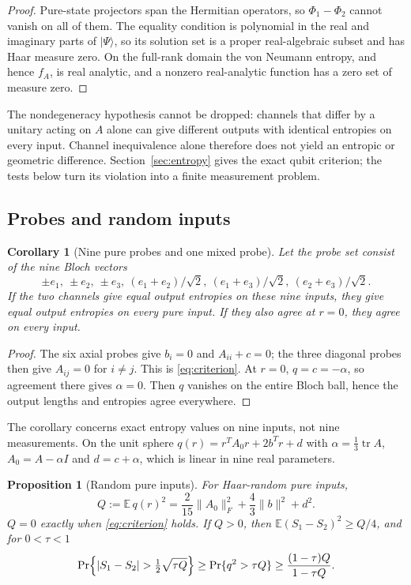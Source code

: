 \documentclass[12pt,a4paper]{article}
\newtheorem{proposition}[theorem]{Proposition}
\newtheorem{corollary}[theorem]{Corollary}
\begin{document}
\begin{proof}
Pure-state projectors span the Hermitian operators, so $\Phi_1-\Phi_2$ cannot vanish on all of them. The equality condition is polynomial in the real and imaginary parts of $|\Psi\rangle$, so its solution set is a proper real-algebraic subset and has Haar measure zero. On the full-rank domain the von Neumann entropy, and hence $f_A$, is real analytic, and a nonzero real-analytic function has a zero set of measure zero.
\end{proof}

The nondegeneracy hypothesis cannot be dropped: channels that differ
by a unitary acting on $A$ alone can give different outputs with
identical entropies on every input. Channel inequivalence alone
therefore does not yield an entropic or geometric difference.
Section~\ref{sec:entropy} gives the exact qubit criterion; the tests
below turn its violation into a finite measurement problem.

\subsection{Probes and random inputs}

\begin{corollary}[Nine pure probes and one mixed probe]
\label{cor:probes}
Let the probe set consist of the nine Bloch vectors
\[
\pm e_1,\ \pm e_2,\ \pm e_3,\ (e_1+e_2)/\sqrt2,\ (e_1+e_3)/\sqrt2,\ (e_2+e_3)/\sqrt2 .
\]
If the two channels give equal output entropies on these nine inputs, they give equal output entropies on every pure input. If they also agree at $r=0$, they agree on every input.
\end{corollary}

\begin{proof}
The six axial probes give $b_i=0$ and $A_{ii}+c=0$; the three diagonal probes then give $A_{ij}=0$ for $i\ne j$. This is \eqref{eq:criterion}. At $r=0$, $q=c=-\alpha$, so agreement there gives $\alpha=0$. Then $q$ vanishes on the entire Bloch ball, hence the output lengths and entropies agree everywhere.
\end{proof}

The corollary concerns exact entropy values on nine inputs, not nine measurements. On the unit sphere $q(r)=r^TA_0r+2b^Tr+d$ with $\alpha=\tfrac13\operatorname{tr}A$, $A_0=A-\alpha I$ and $d=c+\alpha$, which is linear in nine real parameters.

\begin{proposition}[Random pure inputs]
\label{prop:haar}
For Haar-random pure inputs,
\begin{equation}
Q:=\mathbb E\,q(r)^2=\frac{2}{15}\|A_0\|_F^2+\frac43\|b\|^2+d^2 .
\label{eq:Q}
\end{equation}
$Q=0$ exactly when \eqref{eq:criterion} holds. If $Q>0$, then $\mathbb E(S_1-S_2)^2\ge Q/4$, and for $0<\tau<1$
\begin{equation}
\Pr\Bigl\{|S_1-S_2|>\tfrac12\sqrt{\tau Q}\Bigr\}
\ge\Pr\{q^2>\tau Q\}
\ge\frac{(1-\tau)Q}{1-\tau Q}.
\label{eq:detect}
\end{equation}
\end{proposition}
\end{document}

